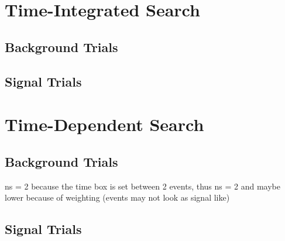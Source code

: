 \chapter{Time-Integrated Search}

\section{Background Trials}

\section{Signal Trials}

\chapter{Time-Dependent Search}

\section{Background Trials}
ns = 2 because the time box is set between 2 events, thus ns = 2 and maybe lower because of weighting (events may not look as signal like)
\section{Signal Trials}
